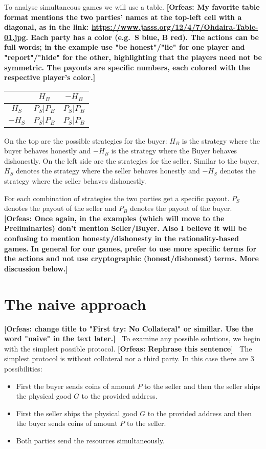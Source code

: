 \documentclass{cacthesis}
\newcommand{\authnote}[3]{{ \footnotesize \textbf{#1[#2: #3]~}}}
\newcommand{\orfnote}[1]{\authnote{\color{blue}}{Orfeas}{#1}}
\begin{document}
To analyse simultaneous games we will use a table.
\orfnote{My favorite table format mentions the two parties' names at the
top-left cell with a diagonal, as in the link:
\url{https://www.jasss.org/12/4/7/Ohdaira-Table-01.jpg}. Each party has a color
(e.g.\ S blue, B red). The actions can be full words; in the example use "be
honest"/"lie" for one player and "report"/"hide" for the other, highlighting
that the players need not be symmetric. The payouts are specific numbers,
each colored with the respective player's color.}

\begin{center}
\begin{tabular}{ c||c|c| }
& $H_B$ & $-H_B$  \\
\hline
\hline
$H_S$ & $P_S | P_B$ & $P_S | P_B$ \\
\hline
$-H_S$ & $P_S | P_B$ & $P_S | P_B$ \\ 
\hline
\end{tabular}
\end{center}

 On the top are the possible strategies for the buyer: $H_B$ is the strategy where the buyer behaves honestly and $-H_B$ is the strategy where the Buyer behaves dishonestly.\newline
On the left side are the strategies for the seller. Similar to the buyer, $H_S$ denotes the strategy where the seller behaves honestly and $-H_S$ denotes the strategy where the seller behaves dishonestly.\newline

For each combination of strategies the two parties get a specific payout. $P_S$ denotes the payout of the seller and $P_B$ denotes the payout of the buyer.
\orfnote{Once again, in the examples (which will move to the Preliminaries)
don't mention Seller/Buyer. Also I believe it will be confusing to mention
honesty/dishonesty in the rationality-based games. In general for our games,
prefer to use more specific terms for the actions and not use cryptographic
(honest/dishonest) terms. More discussion below.}

\section{The naive approach} \orfnote{change title to "First try: No Collateral"
or simillar. Use the word "naive" in the text later.}
To examine any possible solutions, we begin with the simplest possible
protocol. \orfnote{Rephrase this sentence} \newline
The simplest protocol is without collateral nor a third party. In this case there are 3 possibilities:
\begin{itemize}
	\item First the buyer sends coins of amount $P$ to the seller and then the seller ships the physical good $G$ to the provided address.
	\item First the seller ships the physical good $G$ to the provided address and then the buyer sends coins of amount $P$ to the seller.
	\item Both parties send the resources simultaneously.
\end{itemize}
\end{document}
